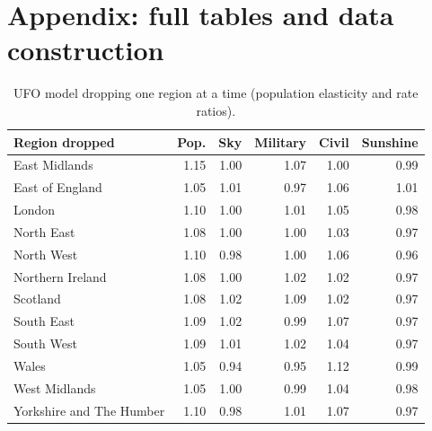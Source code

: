 \documentclass[11pt,a4paper]{article}
\begin{document}
\section{Appendix: full tables and data construction}
\begin{table}[htbp]\centering\small\caption{UFO model dropping one region at a time (population elasticity and rate ratios).}\label{tab:lor}\begin{tabular}{lrrrrr}\toprule Region dropped & Pop. & Sky & Military & Civil & Sunshine\\\midrule
East Midlands & 1.15 & 1.00 & 1.07 & 1.00 & 0.99\\
East of England & 1.05 & 1.01 & 0.97 & 1.06 & 1.01\\
London & 1.10 & 1.00 & 1.01 & 1.05 & 0.98\\
North East & 1.08 & 1.00 & 1.00 & 1.03 & 0.97\\
North West & 1.10 & 0.98 & 1.00 & 1.06 & 0.96\\
Northern Ireland & 1.08 & 1.00 & 1.02 & 1.02 & 0.97\\
Scotland & 1.08 & 1.02 & 1.09 & 1.02 & 0.97\\
South East & 1.09 & 1.02 & 0.99 & 1.07 & 0.97\\
South West & 1.09 & 1.01 & 1.02 & 1.04 & 0.97\\
Wales & 1.05 & 0.94 & 0.95 & 1.12 & 0.99\\
West Midlands & 1.05 & 1.00 & 0.99 & 1.04 & 0.98\\
Yorkshire and The Humber & 1.10 & 0.98 & 1.01 & 1.07 & 0.97\\
\bottomrule\end{tabular}\end{table}
\end{document}
